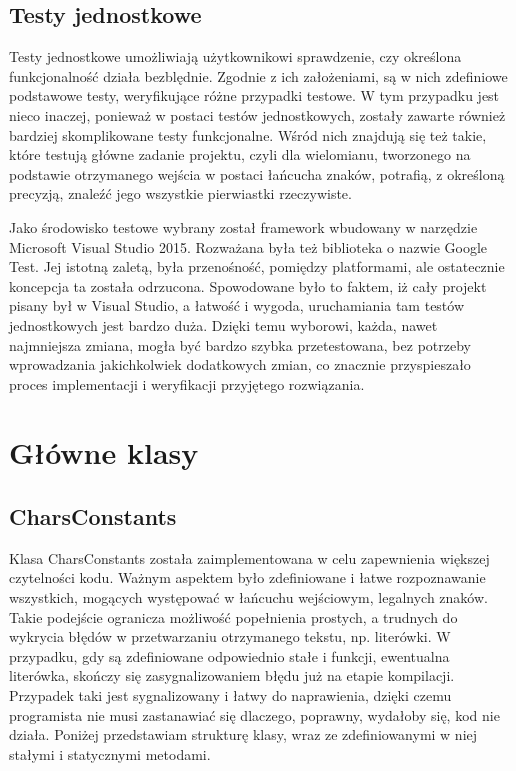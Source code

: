 \documentclass[twoside,a4paper]{book}
\begin{document}
\subsection{Testy jednostkowe}
Testy jednostkowe umożliwiają użytkownikowi sprawdzenie, czy określona funkcjonalność działa bezblędnie. Zgodnie z ich założeniami, są w nich zdefiniowe podstawowe testy, weryfikujące różne przypadki testowe. W tym przypadku jest nieco inaczej, ponieważ w postaci testów jednostkowych, zostały zawarte również bardziej skomplikowane testy funkcjonalne. Wśród nich znajdują się też takie, które testują główne zadanie projektu, czyli dla wielomianu, tworzonego na podstawie otrzymanego wejścia w postaci łańcucha znaków, potrafią, z określoną precyzją, znaleźć jego wszystkie pierwiastki rzeczywiste.

Jako środowisko testowe wybrany został framework wbudowany w narzędzie Microsoft Visual Studio 2015. Rozważana była też biblioteka o nazwie Google Test. Jej istotną zaletą, była przenośność, pomiędzy platformami, ale ostatecznie koncepcja ta została odrzucona. Spowodowane było to faktem, iż cały projekt pisany był w Visual Studio, a łatwość i wygoda, uruchamiania tam testów jednostkowych jest bardzo duża. Dzięki temu wyborowi, każda, nawet najmniejsza zmiana, mogła być bardzo szybka przetestowana, bez potrzeby wprowadzania jakichkolwiek dodatkowych zmian, co znacznie przyspieszało proces implementacji i weryfikacji przyjętego rozwiązania.

\section{Główne klasy}

\subsection{CharsConstants}

Klasa CharsConstants została zaimplementowana w celu zapewnienia większej czytelności kodu. Ważnym aspektem było zdefiniowane i łatwe rozpoznawanie wszystkich, mogących występować w łańcuchu wejściowym, legalnych znaków. Takie podejście ogranicza możliwość popełnienia prostych, a trudnych do wykrycia błędów w przetwarzaniu otrzymanego tekstu, np. literówki. W przypadku, gdy są zdefiniowane odpowiednio stałe i funkcji, ewentualna literówka, skończy się zasygnalizowaniem błędu już na etapie kompilacji. Przypadek taki jest sygnalizowany i łatwy do naprawienia, dzięki czemu programista nie musi zastanawiać się dlaczego, poprawny, wydałoby się, kod nie działa. Poniżej przedstawiam strukturę klasy, wraz ze zdefiniowanymi w niej stałymi i statycznymi metodami. 
\end{document}
